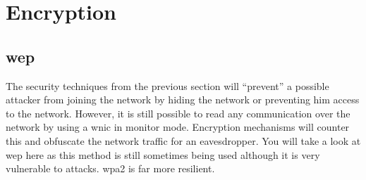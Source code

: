 \section{Encryption}
\subsection{\acs{wep}}

The security techniques from the previous section will ``prevent'' a possible attacker from joining the network by hiding the network or preventing him access to the network. However, it is still possible to read any communication over the network by using a \ac{wnic} in monitor mode. Encryption mechanisms will counter this and obfuscate the network traffic for an eavesdropper. You will take a look at \ac{wep} here as this method is still sometimes being used although it is very vulnerable to attacks. \ac{wpa}2 is far more resilient.


